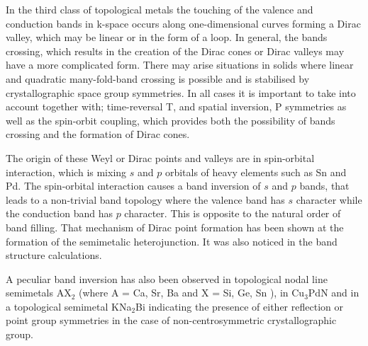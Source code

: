 \documentclass[prb,twocolumn,aps,superscriptaddress,showpacs,floatfix]{revtex4}
\begin{document}
	In the third class of topological metals the touching of the valence and conduction bands in k-space occurs along one-dimensional curves forming a Dirac valley, which may be linear or in the form of a loop. In general, the bands crossing, which results in the creation of the Dirac cones or Dirac valleys may have a more complicated form. There may arise situations in solids where linear and quadratic many-fold-band crossing is possible and is stabilised by crystallographic space group symmetries. In all cases it is important to take into account together with; time-reversal T, and spatial inversion, P symmetries as well as the spin-orbit coupling, which provides both the possibility of bands crossing and the formation of Dirac cones. 

	The origin of these Weyl or Dirac points and valleys are in spin-orbital interaction, which is mixing $s$ and $p$ orbitals of heavy elements such as Sn and Pd\cite{Rashba-1960}. The spin-orbital interaction causes a band inversion of $s$ and $p$ bands, that leads to a non-trivial band topology where the valence band
has $s$ character while the conduction band has $p$ character. This is opposite to the natural order of band filling\cite{opto9}. That mechanism of Dirac point formation has been shown at the formation of the semimetalic heterojunction\cite{b2}. It was also noticed in the band structure calculations\cite{Pulci-2013,Pulci-2013A}.

	A peculiar band inversion has also been observed in topological nodal line semimetals AX$_2$ (where A = Ca, Sr, Ba and X = Si, Ge, Sn \cite{38}), in Cu$_3$PdN\cite{39} and in a topological semimetal KNa$_2$Bi \cite{40} indicating the presence of either reflection or point group symmetries in the case of non-centrosymmetric crystallographic group.

\end{document}
